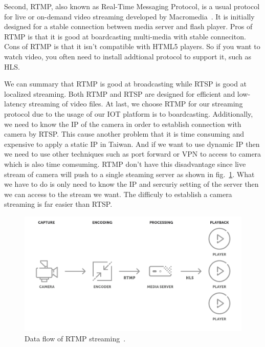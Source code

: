 Second, RTMP, also known as Real-Time Messaging Protocol, is a usual protocol for live or on-demand video streaming developed by Macromedia~\cite{rtmp-inventor}. It is initially designed for a stable connection between media server and flash player. Pros of RTMP is that it is good at boardcasting multi-media with stable conneciton. Cons of RTMP is that it isn't compatible with HTML5 players. So if you want to watch video, you often need to install addtional protocol to support it, such as HLS.

We can summary that RTMP is good at broadcasting while RTSP is good at localized streaming. Both RTMP and RTSP are designed for efficient and low-latency streaming of video files. At last, we choose RTMP for our streaming protocol due to the usage of our IOT platform is to boardcasting. Additionally, we need to know the IP of the camera in order to establish connection with camera by RTSP. This cause another problem that it is time consuming and expensive to apply  a static IP in Taiwan. And if we want to use dynamic IP then we need to use other techniques such as port forward or VPN to access to camera which is also time comsuming. RTMP don't have this disadvantage since live stream of camera will push to a single steaming server as shown in fig.~\ref{fig:rtmp-data-flow}. What we have to do is only need to know the IP and sercuriy setting of the server then we can access to the stream we want. The difficuly to establish a camera streaming is far easier than RTSP.

\begin{figure}[H]
    \centering
    \includegraphics[width=\textwidth]{figsrc/rtmp-data-flow.png}
    \caption{Data flow of RTMP streaming~\cite{rtmp-intro-01}.\label{fig:rtmp-data-flow}}
\end{figure}

